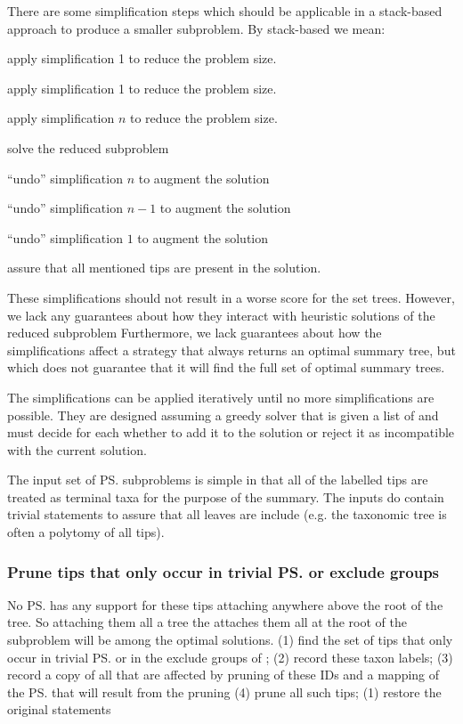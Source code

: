 \documentclass[11pt]{article}
\begin{document}
There are some simplification steps which should be applicable in a stack-based
    approach to produce a smaller subproblem.
By stack-based we mean:
\begin{compactenum}
    \item apply simplification 1 to reduce the problem size.
    \item apply simplification 1 to reduce the problem size.
    \item[$\ldots]
    \item[$n$] apply simplification $n$ to reduce the problem size.
    \item[$n + 1$] solve the reduced subproblem
    \item[$n + 2$]``undo'' simplification $n$ to augment the solution
    \item[$n + 3$] ``undo'' simplification $n-1$ to augment the solution
    \item[$\ldots]
    \item[$2n + 1$] ``undo'' simplification $1$ to augment the solution
    \item[$2n +2$] assure that all mentioned tips are present in the solution.
\end{compactenum}

These simplifications should not result in a worse \SWIPSD score for the set trees.
However, we lack any guarantees about how they interact with heuristic solutions
    of the reduced subproblem 
Furthermore, we lack guarantees about how the simplifications affect a strategy that always
    returns an optimal summary tree, but which does not guarantee that it will
    find the full set of optimal summary trees.

The simplifications can be applied iteratively until no more simplifications are possible.
They are designed assuming a greedy solver that is given a list of \pss and must decide
    for each whether to add it to the solution or reject it as incompatible with the 
    current solution.

The input set of \ps subproblems is simple in that all of the labelled tips are treated
    as terminal taxa for the purpose of the summary.
The inputs do contain trivial statements to assure that all leaves are include (e.g. 
     the taxonomic tree is often a polytomy of all tips).

\subsubsection{Prune tips that only occur in trivial \ps or exclude groups}
No \ps has any support for these tips attaching anywhere above the root of the tree.
So attaching them all a tree the attaches them all at the  root of the subproblem will
    be among the optimal solutions.
\simplification (1) find the set of tips that only occur in trivial \ps or in the exclude
    groups of \pss;
    (2) record these taxon labels;
    (3) record a copy of all \pss that are affected by pruning of these IDs and a mapping
        of the \ps that will result from the pruning
    (4) prune all such tips;
\undoActions (1) restore the original statements
\end{document}
